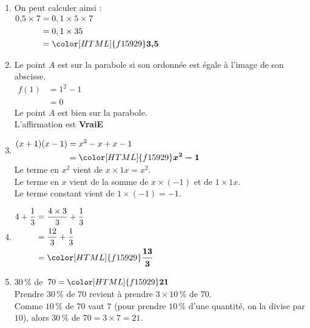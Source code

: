 \documentclass[a4paper,11pt,landscape,exos]{nsi} %
\begin{document}
\begin{multicols}{2}
\maketitle

\begin{enumerate}[itemsep=1em]
    \item On peut calculer ainsi : \\
        $\begin{aligned}
        0{,}5\times7&=0,1\times 5\times7\\
        &=0,1\times 35\\
        &={\color[HTML]{f15929}\boldsymbol{3{,}5}}
        \end{aligned}$
    \item Le point $A$ est sur la parabole si son ordonnée est égale à l'image de son abscisse. \\
        $\begin{aligned}
            f(1)&=1^2-1\\
            &=0
            \end{aligned}$
            \\
            Le point $A$ est bien sur la parabole.\\ L'affirmation est {\bfseries \color[HTML]{f15929}VraiE}
    \item $\begin{aligned}
          (x+1)(x-1)&=x^2-x+x-1\\
          &={\color[HTML]{f15929}\boldsymbol{x^2-1}}
          \end{aligned}$\\Le terme en $x^2$ vient de $x\times 1x=x^2$.\\Le terme en $x$ vient de la somme de $x \times (-1)$ et de $1 \times 1x$.\\Le terme constant vient de $1\times (-1)= -1$.
    \item $\begin{aligned}
          4+\dfrac{1}{3} &= \dfrac{4 \times 3}{3} + \dfrac{1}{3} \\
          &= \dfrac{12}{3} + \dfrac{1}{3}\\
          &  ={\color[HTML]{f15929}\boldsymbol{\dfrac{13}{3}}}
          \end{aligned}$
\vfill\null
\columnbreak
    \item $30\,\%$ de $70 = {\color[HTML]{f15929}\boldsymbol{21}}$\\ Prendre $30\,\%$  de $70$ revient à prendre $3\times 10\,\%$  de $70$.\\
          Comme $10\,\%$  de $70$ vaut $7$ (pour prendre $10\,\%$  d'une quantité, on la divise par $10$), alors
          $30\,\%$ de $70=3\times 7=21$.
         

\end{enumerate}
\end{multicols}
\end{document}
